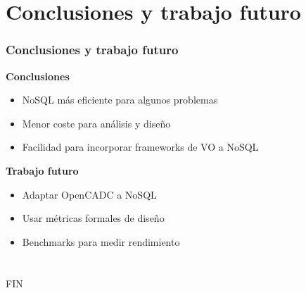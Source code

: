 \documentclass[serif,12pt]{beamer}
\begin{document}
\section{Conclusiones y trabajo futuro}
\begin{frame}
\frametitle{Conclusiones y trabajo futuro}

\begin{multicols}{2}

\textbf{Conclusiones}
\begin{itemize}
\item NoSQL más eficiente para algunos problemas
\item Menor coste para análisis y diseño
\item Facilidad para incorporar frameworks de VO a NoSQL
\end{itemize}

\textbf{Trabajo futuro}
\begin{itemize}
\item Adaptar OpenCADC a NoSQL
\item Usar métricas formales de diseño
\item Benchmarks para medir rendimiento
\end{itemize}

\end{multicols}

\end{frame}



\section{}
\begin{frame}
\frametitle{}
\huge
\begin{center}
FIN
\end{center}
\end{frame}
\end{document}

